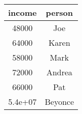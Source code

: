 \documentclass[]{book}
\newenvironment{Shaded}{\begin{snugshade}}{\end{snugshade}}
\newcommand{\KeywordTok}[1]{\textcolor[rgb]{0.13,0.29,0.53}{\textbf{#1}}}
\newcommand{\StringTok}[1]{\textcolor[rgb]{0.31,0.60,0.02}{#1}}
\newcommand{\OperatorTok}[1]{\textcolor[rgb]{0.81,0.36,0.00}{\textbf{#1}}}
\newcommand{\NormalTok}[1]{#1}
\theoremstyle{definition}
\theoremstyle{definition}
\theoremstyle{definition}
\theoremstyle{remark}
\begin{document}
\begin{longtable}[]{@{}cc@{}}
\toprule
\begin{minipage}[b]{0.13\columnwidth}\centering\strut
income\strut
\end{minipage} & \begin{minipage}[b]{0.13\columnwidth}\centering\strut
person\strut
\end{minipage}\tabularnewline
\midrule
\endhead
\begin{minipage}[t]{0.13\columnwidth}\centering\strut
48000\strut
\end{minipage} & \begin{minipage}[t]{0.13\columnwidth}\centering\strut
Joe\strut
\end{minipage}\tabularnewline
\begin{minipage}[t]{0.13\columnwidth}\centering\strut
64000\strut
\end{minipage} & \begin{minipage}[t]{0.13\columnwidth}\centering\strut
Karen\strut
\end{minipage}\tabularnewline
\begin{minipage}[t]{0.13\columnwidth}\centering\strut
58000\strut
\end{minipage} & \begin{minipage}[t]{0.13\columnwidth}\centering\strut
Mark\strut
\end{minipage}\tabularnewline
\begin{minipage}[t]{0.13\columnwidth}\centering\strut
72000\strut
\end{minipage} & \begin{minipage}[t]{0.13\columnwidth}\centering\strut
Andrea\strut
\end{minipage}\tabularnewline
\begin{minipage}[t]{0.13\columnwidth}\centering\strut
66000\strut
\end{minipage} & \begin{minipage}[t]{0.13\columnwidth}\centering\strut
Pat\strut
\end{minipage}\tabularnewline
\begin{minipage}[t]{0.13\columnwidth}\centering\strut
5.4e+07\strut
\end{minipage} & \begin{minipage}[t]{0.13\columnwidth}\centering\strut
Beyonce\strut
\end{minipage}\tabularnewline
\bottomrule
\end{longtable}

\begin{Shaded}
\end{Shaded}
\end{document}

